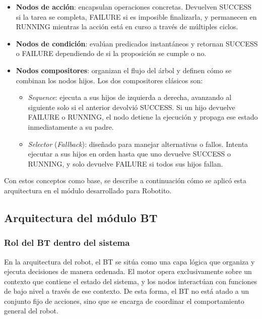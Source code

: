 \documentclass{prgrado}
\begin{document}
\begin{itemize}
    \item \textbf{Nodos de acción}: encapsulan operaciones concretas. Devuelven SUCCESS si la tarea se completa, FAILURE si es imposible finalizarla, y permanecen en RUNNING mientras la acción está en curso a través de múltiples ciclos.

    \item \textbf{Nodos de condición}: evalúan predicados instantáneos y retornan SUCCESS o FAILURE dependiendo de si la proposición se cumple o no.

    \item \textbf{Nodos compositores}: organizan el flujo del árbol y definen cómo se combinan los nodos hijos. Los dos compositores clásicos son:
    \begin{itemize}
        \item \textit{Sequence}: ejecuta a sus hijos de izquierda a derecha, avanzando al siguiente solo si el anterior devolvió SUCCESS. Si un hijo devuelve FAILURE o RUNNING, el nodo detiene la ejecución y propaga ese estado inmediatamente a su padre.
        \item \textit{Selector} (\textit{Fallback}): diseñado para manejar alternativas o fallos. Intenta ejecutar a sus hijos en orden hasta que uno devuelve SUCCESS o RUNNING, y solo devuelve FAILURE si todos sus hijos fallan.
    \end{itemize}
\end{itemize}

Con estos conceptos como base, se describe a continuación cómo se aplicó esta arquitectura en el módulo desarrollado para Robotito.

\subsection{Arquitectura del módulo BT}

\subsubsection{Rol del BT dentro del sistema}

En la arquitectura del robot, el BT se sitúa como una capa lógica que organiza y ejecuta decisiones de manera ordenada. El motor opera exclusivamente sobre un contexto que contiene el estado del sistema, y los nodos interactúan con funciones de bajo nivel a través de ese contexto. De esta forma, el BT no está atado a un conjunto fijo de acciones, sino que se encarga de coordinar el comportamiento general del robot.
\end{document}
